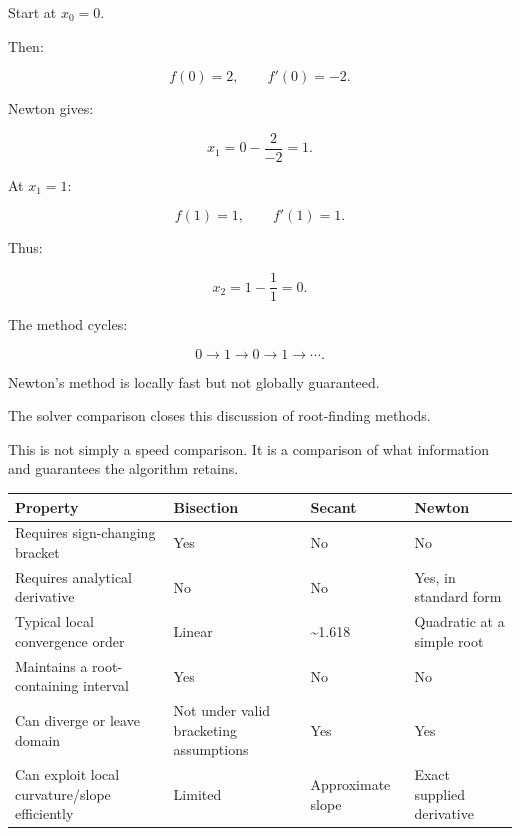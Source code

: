 Start at \(x_0=0\).

Then:

\[ f(0)=2,\qquad f'(0)=-2. \]

Newton gives:

\[ x_1=0-\frac2{-2}=1. \]

At \(x_1=1\):

\[ f(1)=1,\qquad f'(1)=1. \]

Thus:

\[ x_2=1-\frac11=0. \]

The method cycles:

\[ \boxed{0\rightarrow1\rightarrow0\rightarrow1\rightarrow\cdots}. \]

Newton's method is locally fast but not globally guaranteed.

The solver comparison closes this discussion of root-finding methods.

This is not simply a speed comparison. It is a comparison of what information and guarantees the algorithm retains.

{\def\LTcaptype{none} %
\begin{longtable}[]{@{}
  >{\raggedright\arraybackslash}p{}
  >{\raggedright\arraybackslash}p{}
  >{\raggedright\arraybackslash}p{}
  >{\raggedright\arraybackslash}p{}@{}}
\toprule\noalign{}
\begin{minipage}[b]{\linewidth}\raggedright
Property
\end{minipage} & \begin{minipage}[b]{\linewidth}\raggedright
Bisection
\end{minipage} & \begin{minipage}[b]{\linewidth}\raggedright
Secant
\end{minipage} & \begin{minipage}[b]{\linewidth}\raggedright
Newton
\end{minipage} \\
\midrule\noalign{}
\endhead
\bottomrule\noalign{}
\endlastfoot
Requires sign-changing bracket & Yes & No & No \\
Requires analytical derivative & No & No & Yes, in standard form \\
Typical local convergence order & Linear & \textasciitilde1.618 & Quadratic at a simple root \\
Maintains a root-containing interval & Yes & No & No \\
Can diverge or leave domain & Not under valid bracketing assumptions & Yes & Yes \\
Can exploit local curvature/slope efficiently & Limited & Approximate slope & Exact supplied derivative \\
\end{longtable}
}

